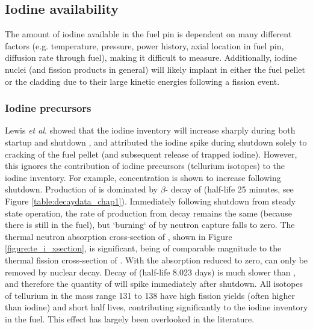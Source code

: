 \subsection{Iodine availability}

The amount of iodine available in the fuel pin is dependent on many different factors (e.g. temperature, pressure, power history, axial location in fuel pin, diffusion rate through fuel), making it difficult to measure. Additionally, iodine nuclei (and fission products in general) will likely implant in either the fuel pellet or the cladding due to their large kinetic energies following a fission event.

\subsubsection{Iodine precursors}

Lewis \emph{et al}. showed that the iodine inventory will increase sharply during both startup and shutdown \cite{Lewis2017}, and attributed the iodine spike during shutdown solely to cracking of the fuel pellet (and subsequent release of trapped iodine). However, this ignores the contribution of iodine precursors (tellurium isotopes) to the iodine inventory. For example,  concentration is shown to increase following shutdown. Production of  is dominated by $\beta$- decay of  (half-life 25 minutes, see Figure \ref{table:decaydata_chap1}). Immediately following shutdown from steady state operation, the rate of  production from  decay remains the same (because there is still  in the fuel), but `burning` of  by neutron capture falls to zero. The thermal neutron absorption cross-section of , shown in Figure \ref{figure:te_i_xsection}, is significant, being of comparable magnitude to the thermal fission cross-section of . With the absorption reduced to zero,  can only be removed by nuclear decay. Decay of  (half-life 8.023 days) is much slower than , and therefore the quantity of  will spike immediately after shutdown. All isotopes of tellurium in the mass range 131 to 138 have high fission yields (often higher than iodine) and short half lives, contributing significantly to the iodine inventory in the fuel. This effect has largely been overlooked in the literature.

